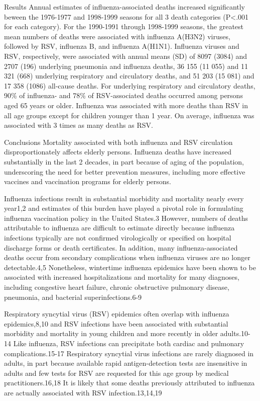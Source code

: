Results  Annual estimates of influenza-associated deaths increased
significantly beween the 1976-1977 and 1998-1999 seasons for all 3 death
categories (P<.001 for each category). For the 1990-1991 through 1998-1999
seasons, the greatest mean numbers of deaths were associated with influenza
A(H3N2) viruses, followed by RSV, influenza B, and influenza A(H1N1). Influenza
viruses and RSV, respectively, were associated with annual means (SD) of 8097
(3084) and 2707 (196) underlying pneumonia and influenza deaths, 36 155 (11
055) and 11 321 (668) underlying respiratory and circulatory deaths, and 51 203
(15 081) and 17 358 (1086) all-cause deaths. For underlying respiratory and
circulatory deaths, 90\% of influenza- and 78\% of RSV-associated deaths occurred
among persons aged 65 years or older. Influenza was associated with more deaths
than RSV in all age groups except for children younger than 1 year. On average,
influenza was associated with 3 times as many deaths as RSV.

Conclusions  Mortality associated with both influenza and RSV circulation
disproportionately affects elderly persons. Influenza deaths have increased
substantially in the last 2 decades, in part because of aging of the
population, underscoring the need for better prevention measures, including
more effective vaccines and vaccination programs for elderly persons.

Influenza infections result in substantial morbidity and mortality nearly every
year1,2 and estimates of this burden have played a pivotal role in formulating
influenza vaccination policy in the United States.3 However, numbers of deaths
attributable to influenza are difficult to estimate directly because influenza
infections typically are not confirmed virologically or specified on hospital
discharge forms or death certificates. In addition, many influenza-associated
deaths occur from secondary complications when influenza viruses are no longer
detectable.4,5 Nonetheless, wintertime influenza epidemics have been shown to
be associated with increased hospitalizations and mortality for many diagnoses,
including congestive heart failure, chronic obstructive pulmonary disease,
pneumonia, and bacterial superinfections.6-9

Respiratory syncytial virus (RSV) epidemics often overlap with influenza
epidemics,8,10 and RSV infections have been associated with substantial
morbidity and mortality in young children and more recently in older
adults.10-14 Like influenza, RSV infections can precipitate both cardiac and
pulmonary complications.15-17 Respiratory syncytial virus infections are rarely
diagnosed in adults, in part because available rapid antigen-detection tests
are insensitive in adults and few tests for RSV are requested for this age
group by medical practitioners.16,18 It is likely that some deaths previously
attributed to influenza are actually associated with RSV infection.13,14,19

